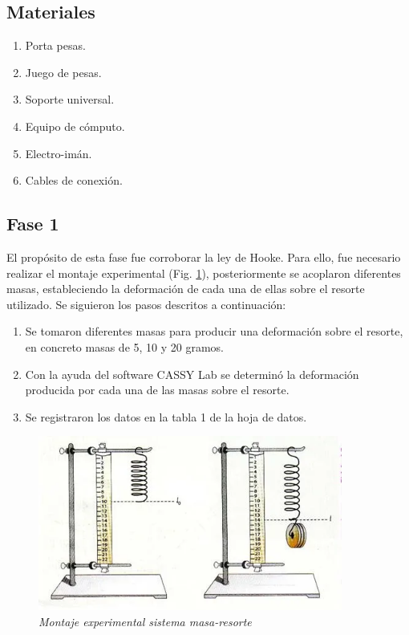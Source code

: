 \documentclass[spanish,notitlepage,letterpaper, 12pt]{article}
\begin{document}
\subsection{Materiales}
\begin{enumerate}
    \item Porta pesas.
    \item Juego de pesas.
    \item Soporte universal.
    \item Equipo de cómputo.
    \item Electro-imán.
    \item Cables de conexión.
\end{enumerate}
\subsection{Fase 1} \label{M.F1}
El propósito de esta fase fue corroborar la ley de Hooke. Para ello, fue necesario realizar el montaje experimental (Fig. \ref{Figura 1}), posteriormente se acoplaron diferentes masas, estableciendo la deformación de cada una de ellas sobre el resorte utilizado. Se siguieron los pasos descritos a continuación:
\begin{enumerate}
    \item Se tomaron diferentes masas para producir una deformación sobre el resorte, en concreto masas de 5, 10 y 20 gramos.
    \item Con la ayuda del software CASSY Lab se determinó la deformación producida por cada una de las masas sobre el resorte.
    \item Se registraron los datos en la tabla 1 de la hoja de datos.
\end{enumerate}
\begin{figure}[h]
    \centering
    \includegraphics[width=10.0cm]{images/I_MontajeMasaResorte.png}
    \caption{\textit{Montaje experimental sistema masa-resorte}}
    \label{Figura 1}
\end{figure}
\end{document}
